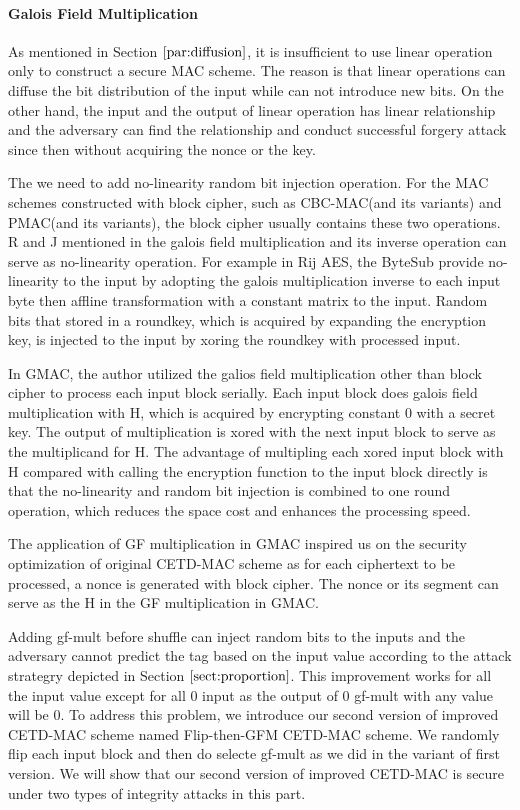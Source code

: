 \paragraph{Galois Field Multiplication}
As mentioned in Section $\ref{par:diffusion}$, it is insufficient to use linear operation
only to construct a secure MAC scheme. The reason is that linear operations can
diffuse the bit distribution of the input while can not introduce new bits. On
the other hand, the input and the output of linear operation has linear
relationship and the adversary can find the relationship and conduct successful
forgery attack since then without acquiring the nonce or the key.

The we need to add no-linearity random bit injection operation. For the MAC
schemes constructed with block cipher, such as CBC-MAC(and its variants) and
PMAC(and its variants), the block cipher usually contains these two operations.
R and J mentioned in \cite{} the galois field multiplication and its inverse
operation can serve as no-linearity operation. 
For example in Rij AES, the ByteSub provide no-linearity to the input by
adopting the galois multiplication inverse to each input byte then affline
transformation with a constant matrix to the input. Random bits that stored in a
roundkey, which is acquired by expanding the encryption key, is injected to the
input by xoring the roundkey with processed input.  

In GMAC, the author utilized the galios field multiplication other than block
cipher to process each input block serially. Each input block does galois field
multiplication with H, which is acquired by encrypting constant 0 with a secret
key. The output of multiplication is xored with the next input block to serve as
the multiplicand for H. The advantage of multipling each xored input block with
H compared with calling the encryption function to the input block directly is
that the no-linearity and random bit injection is combined to one round
operation, which reduces the space cost and enhances the processing speed.

The application of GF multiplication in GMAC inspired us on the security
optimization of original CETD-MAC scheme as for each ciphertext to be processed,
a nonce is generated with block cipher. The nonce or its segment can serve as
the H in the GF multiplication in GMAC. 

Adding gf-mult before shuffle can inject random bits to the inputs and the
adversary cannot predict the tag based on the input value according to the
attack strategry depicted in Section $\ref{sect:proportion}$. This improvement works for all
the input value except for all 0 input as the output of 0 gf-mult with any value
will be 0. To address this problem, we introduce our second version of improved
CETD-MAC scheme named Flip-then-GFM CETD-MAC scheme. We randomly flip each input
block and then do selecte gf-mult as we did in the variant of first version. We
will show that our second version of improved CETD-MAC is secure under two types
of integrity attacks in this part. 
